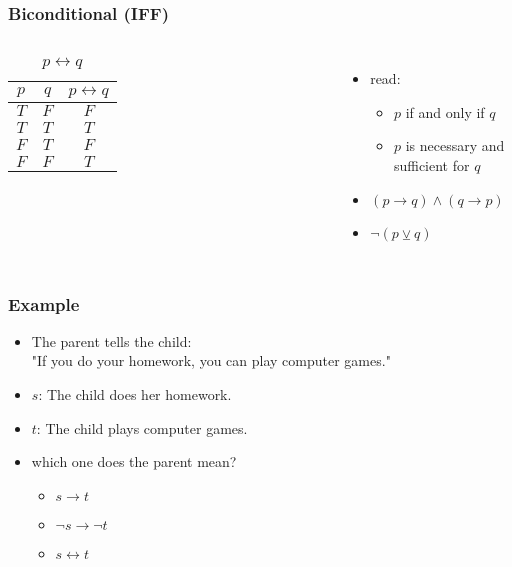 \documentclass[dvipsnames]{beamer}
\begin{document}
\begin{frame}
  \frametitle{Biconditional (IFF)}

  \begin{columns}
    \begin{table}
      \caption{$p \leftrightarrow q$}
      \begin{tabular}{|c|c||c|}\hline
        $p$ & $q$ & $p \leftrightarrow q$\\\hline\hline
        $T$ & $F$ & $F$\\\hline
        $T$ & $T$ & $T$\\\hline
        $F$ & $T$ & $F$\\\hline
        $F$ & $F$ & $T$\\\hline
      \end{tabular}
    \end{table}

    \pause
    \begin{itemize}
      \item read:
      \begin{itemize}
        \item $p$ if and only if $q$
        \item $p$ is necessary and sufficient for $q$
      \end{itemize}

      \pause
      \item $(p \rightarrow q) \wedge (q \rightarrow p)$
      \item $\neg (p \veebar q)$
    \end{itemize}
  \end{columns}
\end{frame}

\begin{frame}
  \frametitle{Example}

  \begin{example}
    \begin{itemize}
      \item The parent tells the child:\\
        "If you do your homework, you can play computer games."

      \pause
      \medskip
      \item $s$: The child does her homework.
      \item $t$: The child plays computer games.

      \pause
      \medskip
      \item which one does the parent mean?
      \begin{itemize}
        \item $s \rightarrow t$
        \item $\neg s \rightarrow \neg t$
        \item $s \leftrightarrow t$
      \end{itemize}
    \end{itemize}
  \end{example}
\end{frame}
\end{document}
